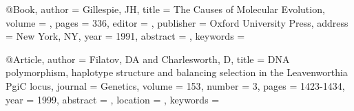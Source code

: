@Book{,
author = {Gillespie, JH}, 
title = {The Causes of Molecular Evolution}, 
volume = {}, 
pages = {336}, 
editor = {}, 
publisher = {Oxford University Press}, 
address = {New York, NY}, 
year = {1991}, 
abstract = {}, 
keywords = {}}

@Article{,
author = {Filatov, DA and Charlesworth, D}, 
title = {DNA polymorphism, haplotype structure and balancing selection in the Leavenworthia PgiC locus}, 
journal = {Genetics}, 
volume = {153}, 
number = {3}, 
pages = {1423-1434}, 
year = {1999}, 
abstract = {}, 
location = {}, 
keywords = {}}


